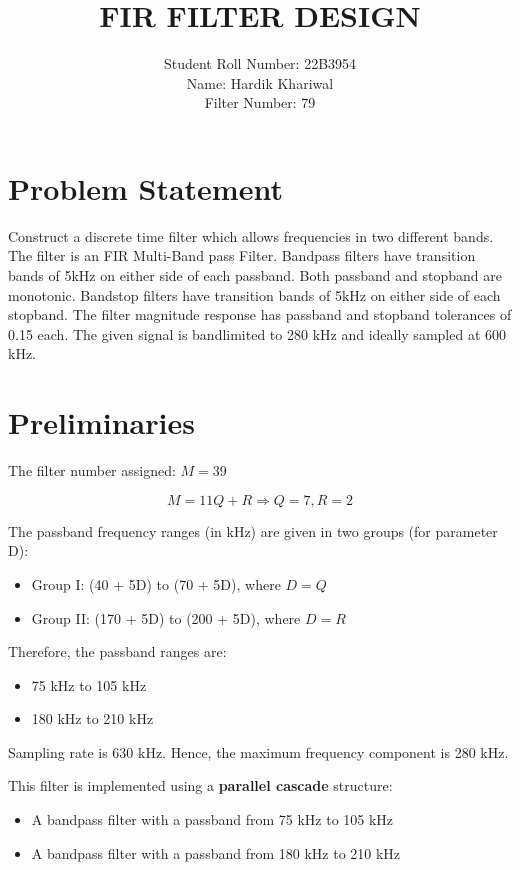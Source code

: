 \documentclass[12pt]{article}
\title{\textbf{FIR FILTER DESIGN}}
\author{Student Roll Number: 22B3954 \\
Name: Hardik Khariwal \\
Filter Number: 79}
\date{}
\begin{document}
\maketitle
\thispagestyle{fancy}

\tableofcontents
\newpage

\section{Problem Statement}
Construct a discrete time filter which allows frequencies in two different bands. The filter is an FIR Multi-Band pass Filter. Bandpass filters have transition bands of 5kHz on either side of each passband. Both passband and stopband are monotonic. Bandstop filters have transition bands of 5kHz on either side of each stopband. The filter magnitude response has passband and stopband tolerances of 0.15 each. The given signal is bandlimited to 280 kHz and ideally sampled at 600 kHz.

\section{Preliminaries}
The filter number assigned: \( M = 39 \)

\[
M = 11Q + R \Rightarrow Q = 7, R = 2
\]

The passband frequency ranges (in kHz) are given in two groups (for parameter D):

\begin{itemize}
    \item Group I: (40 + 5D) to (70 + 5D), where \( D = Q \)
    \item Group II: (170 + 5D) to (200 + 5D), where \( D = R \)
\end{itemize}

Therefore, the passband ranges are:
\begin{itemize}
    \item 75 kHz to 105 kHz
    \item 180 kHz to 210 kHz
\end{itemize}

Sampling rate is 630 kHz. Hence, the maximum frequency component is 280 kHz.

This filter is implemented using a \textbf{parallel cascade} structure:
\begin{itemize}
    \item A bandpass filter with a passband from 75 kHz to 105 kHz
    \item A bandpass filter with a passband from 180 kHz to 210 kHz
\end{itemize}
\end{document}
